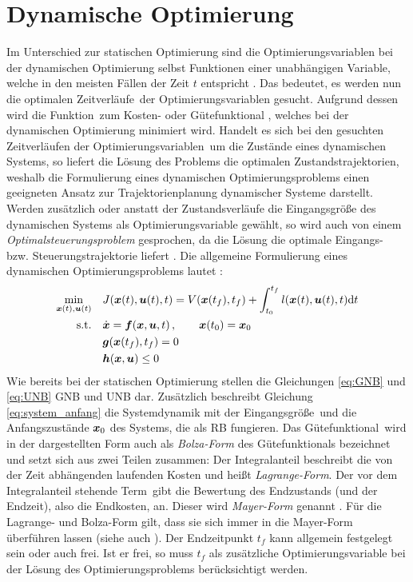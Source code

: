 \section{Dynamische Optimierung}\label{sec:dynamischeOpt}
Im Unterschied zur statischen Optimierung sind die Optimierungsvariablen bei der dynamischen Optimierung selbst Funktionen einer unabhängigen Variable, welche in den meisten Fällen der Zeit $t$ entspricht \cite{KnutGraichen.2012}. Das bedeutet, es werden nun die optimalen Zeitverläufe \xoft\,der Optimierungsvariablen gesucht. Aufgrund dessen wird die Funktion \fofx\,zum Kosten- oder Gütefunktional \J, welches bei der dynamischen Optimierung minimiert wird. Handelt es sich bei den gesuchten Zeitverläufen der Optimierungsvariablen \xoft\,um die Zustände eines dynamischen Systems, so liefert die Lösung des Problems die optimalen Zustandstrajektorien, weshalb die Formulierung eines dynamischen Optimierungsproblems einen geeigneten Ansatz zur Trajektorienplanung dynamischer Systeme darstellt. Werden zusätzlich oder anstatt der Zustandsverläufe die Eingangsgröße des dynamischen Systems als Optimierungsvariable gewählt, so wird auch von einem \textit{Optimalsteuerungsproblem} gesprochen, da die Lösung die optimale Eingangs- bzw. Steuerungstrajektorie liefert \cite{KnutGraichen.2012}.
Die allgemeine Formulierung eines dynamischen Optimierungsproblems lautet \cite{KnutGraichen.2012}:
\begin{align}
\min_{\boldsymbol{x}(t),\boldsymbol{u}(t)} \quad &J(\boldsymbol{x}(t),\boldsymbol{u}(t),t) = V(\boldsymbol{x}(t_f),t_f) + \int_{t_0}^{t_f}l(\boldsymbol{x}(t),\boldsymbol{u}(t),t)\textrm{d}{t} \label{eq:J_dyn}\\
\textrm{s.t.} \quad& \dot{\boldsymbol{x}} = \boldsymbol{f}(\boldsymbol{x},\boldsymbol{u},t)\,,\qquad \boldsymbol{x}(t_0) = \boldsymbol{x}_0 \label{eq:system_anfang}\\
&\boldsymbol{g}(\boldsymbol{x}(t_f),t_f) = 0 \label{eq:GNB}\\
&\boldsymbol{h}(\boldsymbol{x},\boldsymbol{u}) \leq 0 \label{eq:UNB}
\end{align}
Wie bereits bei der statischen Optimierung stellen die Gleichungen \ref{eq:GNB} und \ref{eq:UNB} \gls{GNB} und \gls{UNB} dar. Zusätzlich beschreibt Gleichung \ref{eq:system_anfang} die Systemdynamik mit der Eingangsgröße \uoft\,und die Anfangszustände $\boldsymbol{x}_0$ des Systems, die als \gls{RB} fungieren. Das Gütefunktional \J\,wird in der dargestellten Form auch als \textit{Bolza-Form} des Gütefunktionals bezeichnet und setzt sich aus zwei Teilen zusammen: Der Integralanteil beschreibt die von der Zeit abhängenden laufenden Kosten und heißt \textit{Lagrange-Form}. Der vor dem Integralanteil stehende Term \Vofxoft\,gibt die Bewertung des Endzustands (und der Endzeit), also die Endkosten, an. Dieser wird \textit{Mayer-Form} genannt \cite{KnutGraichen.2012}. Für die Lagrange- und Bolza-Form gilt, dass sie sich immer in die Mayer-Form überführen lassen \cite{KnutGraichen.2012} (siehe auch \cite{Gerdts.2010}). Der Endzeitpunkt $t_f$ kann allgemein festgelegt sein oder auch frei. Ist er frei, so muss $t_f$ als zusätzliche Optimierungsvariable bei der Lösung des Optimierungsproblems berücksichtigt werden. 

